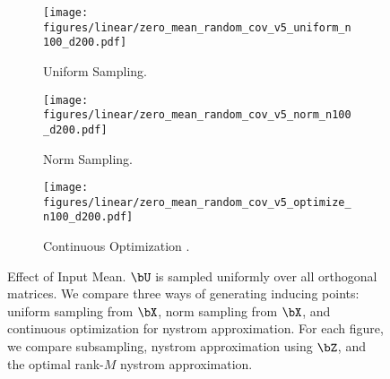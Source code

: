 \begin{figure}[!htb]
\centering
\begin{subfigure}[b]{1.1\textwidth}
 \hspace{-1cm}
       \texttt{[image: figures/linear/zero\_mean\_random\_cov\_v5\_uniform\_n100\_d200.pdf]}
       \caption{Uniform Sampling.}
      \end{subfigure}
\begin{subfigure}[b]{1.1\textwidth}
 \hspace{-1cm}
       \texttt{[image: figures/linear/zero\_mean\_random\_cov\_v5\_norm\_n100\_d200.pdf]}
       \caption{Norm Sampling.}
      \end{subfigure}
\begin{subfigure}[b]{1.1\textwidth}
 \hspace{-1cm}
       \texttt{[image: figures/linear/zero\_mean\_random\_cov\_v5\_optimize\_n100\_d200.pdf]}
       \caption{Continuous Optimization .}
      \end{subfigure}
\caption{Effect of Input Mean. $\bU$ is sampled uniformly over all orthogonal matrices. We compare three ways of generating inducing points: uniform sampling from $\bX$, norm sampling from $\bX$, and continuous optimization for nystrom approximation. For each figure, we compare subsampling, nystrom approximation using $\bZ$, and the optimal rank-$M$ nystrom approximation.}
\end{figure}



